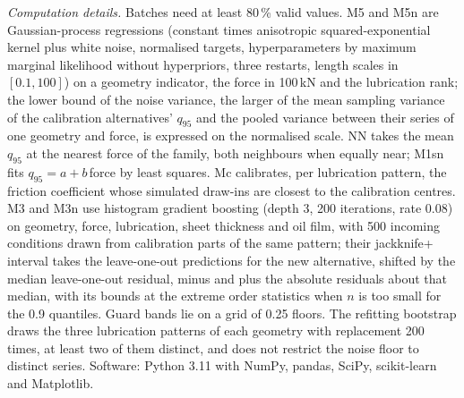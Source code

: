 \documentclass[pdflatex,sn-basic,lineno]{sn-jnl}
\begin{document}
\begin{appendices}
\emph{Computation details.} Batches need at least 80\,\% valid values. M5 and M5n are Gaussian-process regressions (constant times anisotropic squared-exponential kernel plus white noise, normalised targets, hyperparameters by maximum marginal likelihood without hyperpriors, three restarts, length scales in $[0.1, 100]$) on a geometry indicator, the force in 100\,kN and the lubrication rank; the lower bound of the noise variance, the larger of the mean sampling variance of the calibration alternatives' $q_{95}$ and the pooled variance between their series of one geometry and force, is expressed on the normalised scale. NN takes the mean $q_{95}$ at the nearest force of the family, both neighbours when equally near; M1sn fits $q_{95}=a+b\,$force by least squares. Mc calibrates, per lubrication pattern, the friction coefficient whose simulated draw-ins are closest to the calibration centres. M3 and M3n use histogram gradient boosting (depth 3, 200 iterations, rate 0.08) on geometry, force, lubrication, sheet thickness and oil film, with 500 incoming conditions drawn from calibration parts of the same pattern; their jackknife+ interval takes the leave-one-out predictions for the new alternative, shifted by the median leave-one-out residual, minus and plus the absolute residuals about that median, with its bounds at the extreme order statistics when $n$ is too small for the 0.9 quantiles. Guard bands lie on a grid of 0.25 floors. The refitting bootstrap draws the three lubrication patterns of each geometry with replacement 200 times, at least two of them distinct, and does not restrict the noise floor to distinct series. Software: Python 3.11 with NumPy, pandas, SciPy, scikit-learn \citep{pedregosa2011scikit} and Matplotlib.


\end{appendices}
\end{document}
